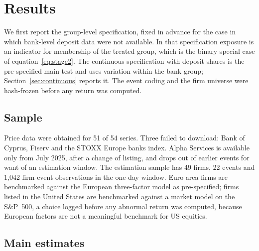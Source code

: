 \documentclass[11pt]{article}
\theoremstyle{plain}\newtheorem{proposition}{Proposition}
\begin{document}
\section{Results}\label{sec:results}

We first report the group-level specification, fixed in advance for the case in which bank-level deposit data were not available. In that specification exposure is an indicator for membership of the treated group, which is the binary special case of equation~\eqref{eq:stage2}. The continuous specification with deposit shares is the pre-specified main test and uses variation within the bank group; Section~\ref{sec:continuous} reports it. The event coding and the firm universe were hash-frozen before any return was computed.

\subsection{Sample}

Price data were obtained for 51 of 54 series. Three failed to download: Bank of Cyprus, Fiserv and the STOXX Europe banks index. Alpha Services is available only from July 2025, after a change of listing, and drops out of earlier events for want of an estimation window. The estimation sample has 49 firms, 22 events and 1,042 firm-event observations in the one-day window. Euro area firms are benchmarked against the European three-factor model as pre-specified; firms listed in the United States are benchmarked against a market model on the S\&P~500, a choice logged before any abnormal return was computed, because European factors are not a meaningful benchmark for US equities.

\subsection{Main estimates}
\end{document}
